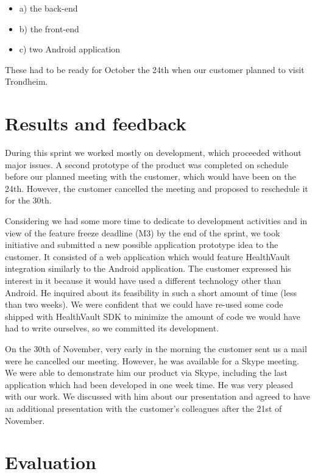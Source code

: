 \begin{itemize}
\item a) the back-end
\item b) the front-end
\item c) two Android application
\end{itemize}
These had to be ready for October the 24th when our customer planned to visit Trondheim.

\section{Results and feedback}

During this sprint we worked mostly on development, which proceeded without major issues.
A second prototype of the product was completed on schedule before our planned meeting with the customer, which would have been on the 24th.
However, the customer cancelled the meeting and proposed to reschedule it for the 30th.

Considering we had some more time to dedicate to development activities and in view of the feature freeze deadline (M3) by the end of the sprint, we took initiative and submitted a new possible application prototype idea to the customer.
It consisted of a web application which would feature HealthVault integration similarly to the Android application.
The customer expressed his interest in it because it would have used a different technology other than Android. He inquired about its feasibility in such a short amount of time (less than two weeks). We were confident that we could have re-used some code shipped with HealthVault SDK to minimize the amount of code we would have had to write ourselves, so we committed its development.

On the 30th of November, very early in the morning the customer sent us a mail were he cancelled our meeting. 
However, he was available for a Skype meeting.
We were able to demonstrate him our product via Skype, including the last application which had been developed in one week time. He was very pleased with our work.
We discussed with him about our presentation and agreed to have an additional presentation with the customer's colleagues after the 21st of November.

\section{Evaluation}

